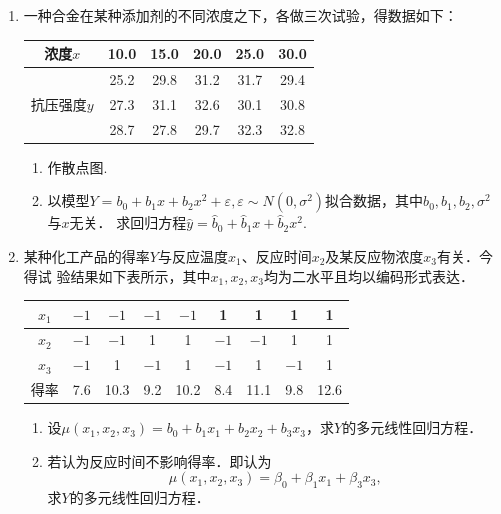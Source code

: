 \begin{enumerate}
    \item 一种合金在某种添加剂的不同浓度之下，各做三次试验，得数据如下：   
    \renewcommand{\arraystretch}{1.3}
    \begin{table}[H]\centering
        \begin{tabular}{c|ccccc}
        \hline
        浓度$x$                    & 10.0 & 15.0 & 20.0 & 25.0 & 30.0 \\ \hline
        \multirow{3}{*}{抗压强度$y$} & 25.2 & 29.8 & 31.2 & 31.7 & 29.4 \\ \cline{2-6} 
                                 & 27.3 & 31.1 & 32.6 & 30.1 & 30.8 \\ \cline{2-6} 
                                 & 28.7 & 27.8 & 29.7 & 32.3 & 32.8 \\ \hline
        \end{tabular}
    \end{table}
    \renewcommand{\arraystretch}{1.0}
    \begin{enumerate}
        \item 作散点图.
        \item 以模型$Y=b_0+b_1x+b_2x^2+\varepsilon,\varepsilon\sim N(0,\sigma^2)$拟合数据，其中$b_0,b_1,b_2,\sigma^2$与$x$无关．
        求回归方程$\hat{y}=\hat{b}_0+\hat{b}_1x+\hat{b}_2x^2$.
    \end{enumerate}







    \item 某种化工产品的得率$Y$与反应温度$x_1$、反应时间$x_2$及某反应物浓度$x_3$有关．今得试
    验结果如下表所示，其中$x_1,x_2,x_3$均为二水平且均以编码形式表达．
    \renewcommand{\arraystretch}{1.3}
    \begin{table}[H]\centering
        \begin{tabular}{c|cccccccc}
        \hline
        $x_1$ & $-1$ & $-1$ & $-1$ & $-1$ & 1    & 1    & 1    & 1    \\ \hline
        $x_2$ & $-1$ & $-1$ & 1    & 1    & $-1$ & $-1$ & 1    & 1    \\ \hline
        $x_3$ & $-1$ & 1    & $-1$ & 1    & $-1$ & 1    & $-1$ & 1    \\ \hline
        得率    & 7.6  & 10.3 & 9.2  & 10.2 & 8.4  & 11.1 & 9.8  & 12.6 \\ \hline
        \end{tabular}
    \end{table}
    \renewcommand{\arraystretch}{1.0}
    \begin{enumerate}
        \item 设$\mu(x_1,x_2,x_3)=b_0+b_1x_1+b_2x_2+b_3x_3$，求$Y$的多元线性回归方程．
        \item 若认为反应时间不影响得率．即认为
        $$\mu(x_1,x_2,x_3)=\beta_0+\beta_1x_1+\beta_3x_3,$$
        求$Y$的多元线性回归方程．
    \end{enumerate}


    









  

\end{enumerate}
